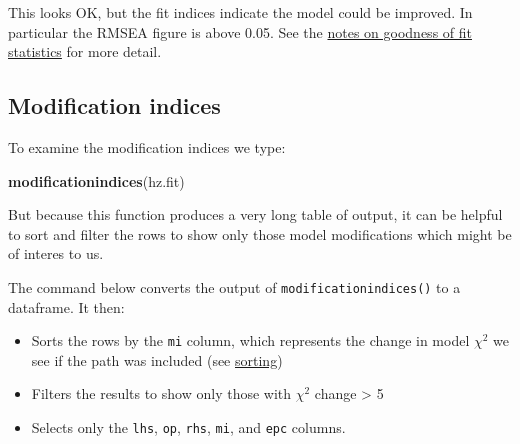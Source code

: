 \documentclass[]{article}
\newenvironment{Shaded}{\begin{snugshade}}{\end{snugshade}}
\newcommand{\KeywordTok}[1]{\textcolor[rgb]{0.13,0.29,0.53}{\textbf{#1}}}
\newcommand{\DataTypeTok}[1]{\textcolor[rgb]{0.13,0.29,0.53}{#1}}
\newcommand{\DecValTok}[1]{\textcolor[rgb]{0.00,0.00,0.81}{#1}}
\newcommand{\StringTok}[1]{\textcolor[rgb]{0.31,0.60,0.02}{#1}}
\newcommand{\OperatorTok}[1]{\textcolor[rgb]{0.81,0.36,0.00}{\textbf{#1}}}
\newcommand{\NormalTok}[1]{#1}
\providecommand{\tightlist}{%
  \setlength{\itemsep}{0pt}\setlength{\parskip}{0pt}}
\theoremstyle{definition}
\theoremstyle{definition}
\theoremstyle{definition}
\theoremstyle{remark}
\begin{document}
This looks OK, but the fit indices indicate the model could be improved.
In particular the RMSEA figure is above 0.05. See the
\protect\hyperlink{gof}{notes on goodness of fit statistics} for more
detail.

\subsection*{Modification indices}\label{modification-indices}

To examine the modification indices we type:

\begin{Shaded}
\begin{Highlighting}[]
\KeywordTok{modificationindices}\NormalTok{(hz.fit)}
\end{Highlighting}
\end{Shaded}

But because this function produces a very long table of output, it can
be helpful to sort and filter the rows to show only those model
modifications which might be of interes to us.

The command below converts the output of \texttt{modificationindices()}
to a dataframe. It then:

\begin{itemize}
\tightlist
\item
  Sorts the rows by the \texttt{mi} column, which represents the change
  in model \(\chi^2\) we see if the path was included (see
  \protect\hyperlink{sorting}{sorting})
\item
  Filters the results to show only those with \(\chi^2\) change
  \textgreater{} 5
\item
  Selects only the \texttt{lhs}, \texttt{op}, \texttt{rhs}, \texttt{mi},
  and \texttt{epc} columns.
\end{itemize}

\begin{Shaded}
\end{Shaded}
\end{document}
